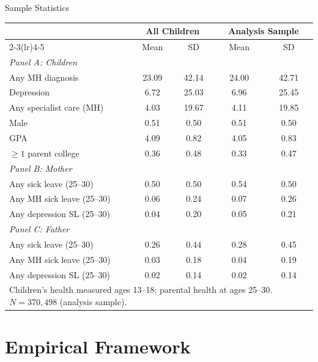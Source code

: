 \documentclass[aspectratio=169]{beamer}
\begin{document}
\begin{frame}{Sample Statistics}
  \scriptsize
  \begin{table}
  \centering
  \begin{tabular}{lcccc}
  \toprule
  & \multicolumn{2}{c}{All Children} & \multicolumn{2}{c}{Analysis Sample} \\
  \cmidrule(lr){2-3}\cmidrule(lr){4-5}
  & Mean & SD & Mean & SD \\
  \midrule
  \multicolumn{5}{l}{\textit{Panel A: Children}} \\
  Any MH diagnosis          & 23.09 & 42.14 & 24.00 & 42.71 \\
  Depression                & 6.72  & 25.03 & 6.96  & 25.45 \\
  Any specialist care (MH)  & 4.03  & 19.67 & 4.11  & 19.85 \\
  Male                      & 0.51  & 0.50  & 0.51  & 0.50  \\
  GPA                       & 4.09  & 0.82  & 4.05  & 0.83  \\
  $\geq 1$ parent college   & 0.36  & 0.48  & 0.33  & 0.47  \\
  \midrule
  \multicolumn{5}{l}{\textit{Panel B: Mother}} \\
  Any sick leave (25--30)   & 0.50  & 0.50  & 0.54  & 0.50  \\
  Any MH sick leave (25--30)& 0.06  & 0.24  & 0.07  & 0.26  \\
  Any depression SL (25--30)& 0.04  & 0.20  & 0.05  & 0.21  \\
  \midrule
  \multicolumn{5}{l}{\textit{Panel C: Father}} \\
  Any sick leave (25--30)   & 0.26  & 0.44  & 0.28  & 0.45  \\
  Any MH sick leave (25--30)& 0.03  & 0.18  & 0.04  & 0.19  \\
  Any depression SL (25--30)& 0.02  & 0.14  & 0.02  & 0.14  \\
  \bottomrule
  \multicolumn{5}{p{0.85\linewidth}}{\scriptsize Children's health measured ages 13--18; parental health at ages 25--30. $N=370{,}498$ (analysis sample).}
  \end{tabular}
  \end{table}
\end{frame}


\section{Empirical Framework}
\end{document}
